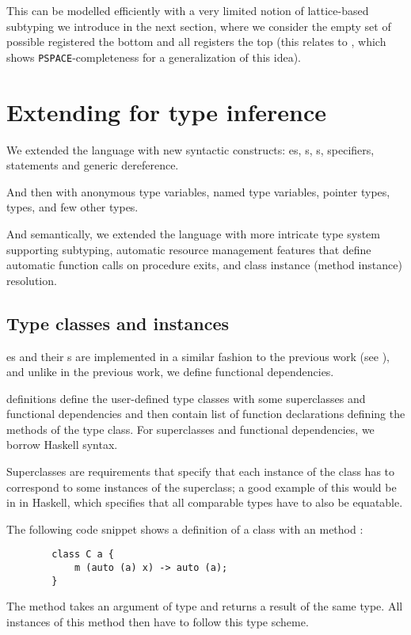 This can be modelled efficiently with a very limited notion of lattice-based subtyping we introduce in the next section, where we consider the empty set of possible registered the bottom and all registers the top (this relates to \cite{tiuryn1999subtyping}, which shows \texttt{PSPACE}-completeness for a generalization of this idea).

\section{Extending \cmm{} for type inference}

We extended the language with new syntactic constructs: es, s, s,  specifiers,  statements and \li{[ptr]} generic dereference.

And then with  anonymous type variables,  named type variables,  pointer types,  types, and few other types.

And semantically, we extended the language with more intricate type system supporting subtyping, automatic resource management features that define automatic function calls on procedure exits, and class instance (method instance) resolution.

\subsection{Type classes and instances}

es and their s are implemented in a similar fashion to the previous work (see \cite{klepl2020type}), and unlike in the previous work, we define functional dependencies.

 definitions define the user-defined type classes with some superclasses and functional dependencies and then contain list of function declarations defining the methods of the type class. For superclasses and functional dependencies, we borrow Haskell syntax.

Superclasses are requirements that specify that each instance of the class has to correspond to some instances of the superclass; a good example of this would be  in  in Haskell, which specifies that all comparable types have to also be equatable.

\begin{ex}[Classes]
    The following code snippet shows a definition of a class  with an method :

    \begin{lstlisting}
        class C a {
            m (auto (a) x) -> auto (a);
        }
    \end{lstlisting}

    The method  takes an argument of type  and returns a result of the same type. All instances of this method then have to follow this type scheme.
\end{ex}

